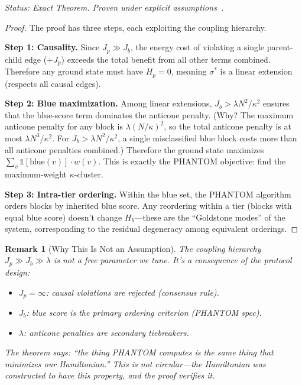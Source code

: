 \documentclass[11pt,a4paper]{article}
\newtheorem{remark}[theorem]{Remark}
\begin{document}
\emph{Status: \textcolor{measured}{Exact Theorem}. Proven under explicit assumptions~\cite{qnk-node-system}.}

\begin{proof}
The proof has three steps, each exploiting the coupling hierarchy.

\textbf{Step 1: Causality.} Since $J_p \gg J_b$, the energy cost of violating a single parent-child edge ($+J_p$) exceeds the total benefit from all other terms combined. Therefore any ground state must have $H_p = 0$, meaning $\sigma^*$ is a linear extension (respects all causal edges).

\textbf{Step 2: Blue maximization.} Among linear extensions, $J_b > \lambda N^2/\kappa^2$ ensures that the blue-score term dominates the anticone penalty. (Why? The maximum anticone penalty for any block is $\lambda(N/\kappa)^2$, so the total anticone penalty is at most $\lambda N^3/\kappa^2$. For $J_b > \lambda N^2/\kappa^2$, a single misclassified blue block costs more than all anticone penalties combined.) Therefore the ground state maximizes $\sum_v \mathbb{1}[\text{blue}(v)] \cdot w(v)$. This is exactly the PHANTOM objective: find the maximum-weight $\kappa$-cluster.

\textbf{Step 3: Intra-tier ordering.} Within the blue set, the PHANTOM algorithm orders blocks by inherited blue score. Any reordering within a tier (blocks with equal blue score) doesn't change $H_b$---these are the ``Goldstone modes'' of the system, corresponding to the residual degeneracy among equivalent orderings.
\end{proof}

\begin{remark}[Why This Is Not an Assumption]
The coupling hierarchy $J_p \gg J_b \gg \lambda$ is not a free parameter we tune. It's a consequence of the protocol design:
\begin{itemize}[nosep]
    \item $J_p = \infty$: causal violations are rejected (consensus rule).
    \item $J_b$: blue score is the primary ordering criterion (PHANTOM spec).
    \item $\lambda$: anticone penalties are secondary tiebreakers.
\end{itemize}
The theorem says: ``the thing PHANTOM computes is the same thing that minimizes our Hamiltonian.'' This is not circular---the Hamiltonian was constructed to have this property, and the proof verifies it.
\end{remark}
\end{document}
